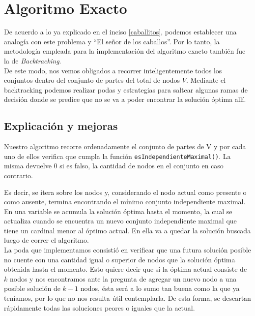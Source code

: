 \section{Algoritmo Exacto}
De acuerdo a lo ya explicado en el inciso \ref{caballitos}, podemos establecer una analog\'ia con este problema y ``El se\~nor de los caballos''. Por lo tanto, la metodolog\'ia empleada para la implementaci\'on del algoritmo exacto tambi\'en fue la de \emph{Backtracking}.\\

De este modo, nos vemos obligados a recorrer inteligentemente todos los conjuntos dentro del conjunto de partes del total de nodos $V$. Mediante el backtracking podemos realizar podas y estrategias para saltear algunas ramas de decisi\'on donde se predice que no se va a poder encontrar la soluci\'on \'optima all\'i.


\subsection{Explicaci\'on y mejoras}

Nuestro algoritmo recorre ordenadamente el conjunto de partes de V y por cada uno de ellos verifica que cumpla la funci\'on  \texttt{esIndependienteMaximal()}. La misma devuelve 0 si es falso, la cantidad de nodos en el conjunto en caso contrario.

Es decir, se itera sobre los nodos y, considerando el nodo actual como presente o como ausente, termina encontrando el m\'inimo conjunto independiente maximal.\\

En una variable se acumula la soluci\'on \'optima hasta el momento, la cual se actualiza cuando se encuentra un nuevo conjunto independiente maximal que tiene un cardinal menor al \'optimo actual. 
En ella va a quedar la soluci\'on buscada luego de correr el algoritmo.\\

La poda que implementamos consisti\'o en verificar que una futura soluci\'on posible no cuente con una cantidad igual o superior de nodos que la soluci\'on \'optima obtenida hasta el momento. 
Esto quiere decir que si la \'optima actual consiste de $k$ nodos y nos encontramos ante la pregunta de agregar un nuevo nodo a una posible soluci\'on de $k - 1$ nodos, \'esta ser\'a a lo sumo 
tan buena como la que ya ten\'iamos, por lo que no nos resulta \'util contemplarla. De esta forma, se descartan r\'apidamente todas las soluciones peores o iguales que la actual.\\

